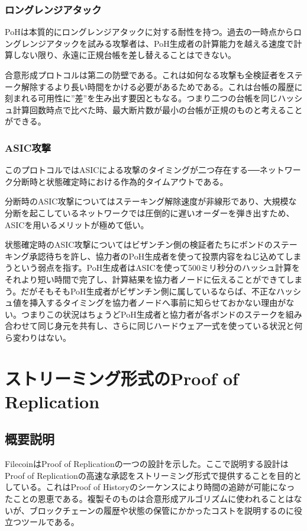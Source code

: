 \documentclass[12pt]{ltjsarticle}
\begin{document}
\subsubsection{ロングレンジアタック}
PoHは本質的にロングレンジアタックに対する耐性を持つ。過去の一時点からロングレンジアタックを試みる攻撃者は、PoH生成者の計算能力を越える速度で計算しない限り、永遠に正規台帳を差し替えることはできない。

合意形成プロトコルは第二の防壁である。これは如何なる攻撃も全検証者をステーク解除するより長い時間をかける必要があるためである。これは台帳の履歴に刻まれる可用性に”差”を生み出す要因ともなる。つまり二つの台帳を同じハッシュ計算回数時点で比べた時、最大断片数が最小の台帳が正規のものと考えることができる。

\subsubsection{ASIC攻撃}

このプロトコルではASICによる攻撃のタイミングが二つ存在する──ネットワーク分断時と状態確定時における作為的タイムアウトである。

分断時のASIC攻撃についてはステーキング解除速度が非線形であり、大規模な分断を起こしているネットワークでは圧倒的に遅いオーダーを弾き出すため、ASICを用いるメリットが極めて低い。

状態確定時のASIC攻撃についてはビザンチン側の検証者たちにボンドのステーキング承認待ちを許し、協力者のPoH生成者を使って投票内容をねじ込めてしまうという弱点を指す。PoH生成者はASICを使って500ミリ秒分のハッシュ計算をそれより短い時間で完了し、計算結果を協力者ノードに伝えることができてしまう。だがそもそもPoH生成者がビザンチン側に属しているならば、不正なハッシュ値を挿入するタイミングを協力者ノードへ事前に知らせておかない理由がない。つまりこの状況はちょうどPoH生成者と協力者が各ボンドのステークを組み合わせて同じ身元を共有し、さらに同じハードウェア一式を使っている状況と何ら変わりはない。

\section{ストリーミング形式のProof of Replication}\label{porep}
\subsection{概要説明}
FilecoinはProof of Replicationの一つの設計を示した\cite{filecoinporep}。ここで説明する設計はProof of Replicationの高速な承認をストリーミング形式で提供することを目的としている。これはProof of Historyのシーケンスにより時間の追跡が可能になったことの恩恵である。複製そのものは合意形成アルゴリズムに使われることはないが、ブロックチェーンの履歴や状態の保管にかかったコストを説明するのに役立つツールである。
\end{document}
